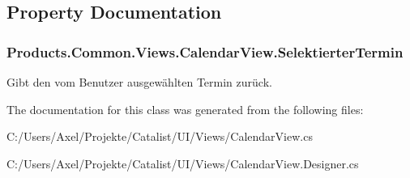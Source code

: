 \subsection{Property Documentation}
\subsubsection[{\texorpdfstring{Selektierter\+Termin}{SelektierterTermin}}]{ Products.\+Common.\+Views.\+Calendar\+View.\+Selektierter\+Termin\hspace{0.3cm}{\ttfamily [get]}}\hypertarget{class_products_1_1_common_1_1_views_1_1_calendar_view_af0c4fcbe1e35ba4dc8aca37ce41fc641}{}\label{class_products_1_1_common_1_1_views_1_1_calendar_view_af0c4fcbe1e35ba4dc8aca37ce41fc641}


Gibt den vom Benutzer ausgewählten Termin zurück. 



The documentation for this class was generated from the following files\+:\begin{DoxyCompactItemize}
\item 
C\+:/\+Users/\+Axel/\+Projekte/\+Catalist/\+U\+I/\+Views/Calendar\+View.\+cs\item 
C\+:/\+Users/\+Axel/\+Projekte/\+Catalist/\+U\+I/\+Views/Calendar\+View.\+Designer.\+cs\end{DoxyCompactItemize}
